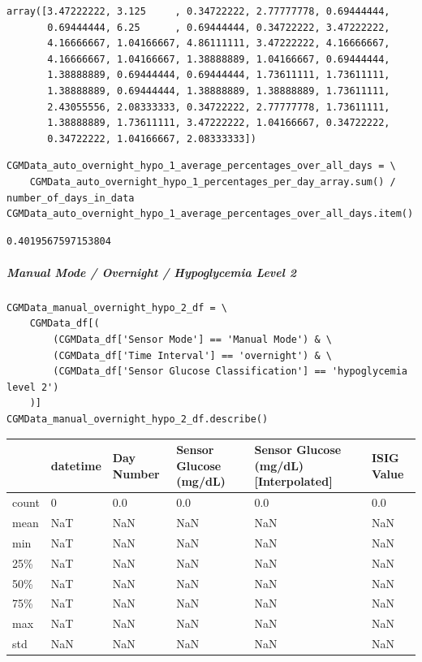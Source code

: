 \begin{verbatim}
array([3.47222222, 3.125     , 0.34722222, 2.77777778, 0.69444444,
       0.69444444, 6.25      , 0.69444444, 0.34722222, 3.47222222,
       4.16666667, 1.04166667, 4.86111111, 3.47222222, 4.16666667,
       4.16666667, 1.04166667, 1.38888889, 1.04166667, 0.69444444,
       1.38888889, 0.69444444, 0.69444444, 1.73611111, 1.73611111,
       1.38888889, 0.69444444, 1.38888889, 1.38888889, 1.73611111,
       2.43055556, 2.08333333, 0.34722222, 2.77777778, 1.73611111,
       1.38888889, 1.73611111, 3.47222222, 1.04166667, 0.34722222,
       0.34722222, 1.04166667, 2.08333333])
\end{verbatim}

\begin{verbatim}
CGMData_auto_overnight_hypo_1_average_percentages_over_all_days = \
    CGMData_auto_overnight_hypo_1_percentages_per_day_array.sum() / number_of_days_in_data
CGMData_auto_overnight_hypo_1_average_percentages_over_all_days.item()
\end{verbatim}

\begin{verbatim}
0.4019567597153804
\end{verbatim}

\subparagraph{Manual Mode / Overnight / Hypoglycemia Level 2}

\begin{verbatim}
CGMData_manual_overnight_hypo_2_df = \
    CGMData_df[(
        (CGMData_df['Sensor Mode'] == 'Manual Mode') & \
        (CGMData_df['Time Interval'] == 'overnight') & \
        (CGMData_df['Sensor Glucose Classification'] == 'hypoglycemia level 2')
    )]
CGMData_manual_overnight_hypo_2_df.describe()
\end{verbatim}

\bigskip\noindent
\begin{tabular}{p{}p{}p{}p{}p{}p{}}
\toprule
 & datetime & Day Number & Sensor Glucose (mg/dL) & Sensor Glucose (mg/dL) [Interpolated] & ISIG Value \\
\hline
count & 0 & 0.0 & 0.0 & 0.0 & 0.0 \\
\hline
mean & NaT & NaN & NaN & NaN & NaN \\
\hline
min & NaT & NaN & NaN & NaN & NaN \\
\hline
25\% & NaT & NaN & NaN & NaN & NaN \\
\hline
50\% & NaT & NaN & NaN & NaN & NaN \\
\hline
75\% & NaT & NaN & NaN & NaN & NaN \\
\hline
max & NaT & NaN & NaN & NaN & NaN \\
\hline
std & NaN & NaN & NaN & NaN & NaN \\
\hline
\bottomrule
\end{tabular}

